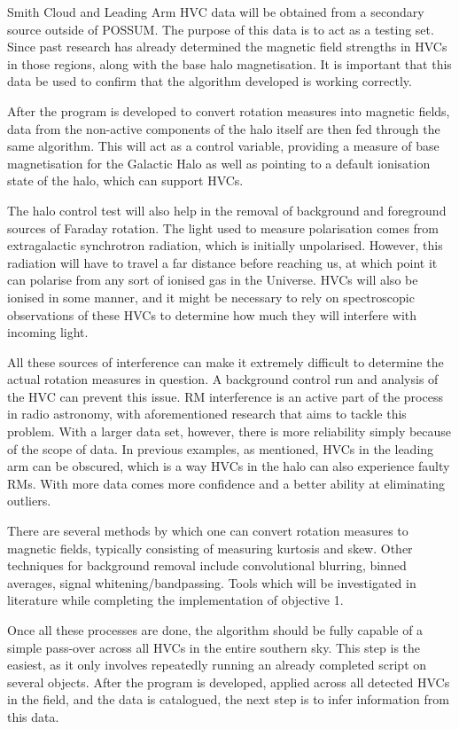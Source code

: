 Smith Cloud and Leading Arm HVC data will be obtained from a secondary source outside of POSSUM. The purpose of this data is to act as a testing set. Since past research has already determined the magnetic field strengths in HVCs in those regions, along with the base halo magnetisation. It is important that this data be used to confirm that the algorithm developed is working correctly.

After the program is developed to convert rotation measures into magnetic fields, data from the non-active components of the halo itself are then fed through the same algorithm. This will act as a control variable, providing a measure of base magnetisation for the Galactic Halo as well as pointing to a default ionisation state of the halo, which can support HVCs.

The halo control test will also help in the removal of background and foreground sources of Faraday rotation. The light used to measure polarisation comes from extragalactic synchrotron radiation, which is initially unpolarised. However, this radiation will have to travel a far distance before reaching us, at which point it can polarise from any sort of ionised gas in the Universe. HVCs will also be ionised in some manner, and it might be necessary to rely on spectroscopic observations of these HVCs to determine how much they will interfere with incoming light.

All these sources of interference can make it extremely difficult to determine the actual rotation measures in question. A background control run and analysis of the HVC can prevent this issue. RM interference is an active part of the process in radio astronomy, with aforementioned research that aims to tackle this problem. With a larger data set, however, there is more reliability simply because of the scope of data. In previous examples, as mentioned, HVCs in the leading arm can be obscured, which is a way HVCs in the halo can also experience faulty RMs. With more data comes more confidence and a better ability at eliminating outliers.

There are several methods by which one can convert rotation measures to magnetic fields, typically consisting of measuring kurtosis and skew. Other techniques for background removal include convolutional blurring, binned averages, signal whitening/bandpassing. Tools which will be investigated in literature while completing the implementation of objective 1.

Once all these processes are done, the algorithm should be fully capable of a simple pass-over across all HVCs in the entire southern sky. This step is the easiest, as it only involves repeatedly running an already completed script on several objects. After the program is developed, applied across all detected HVCs in the field, and the data is catalogued, the next step is to infer information from this data.

